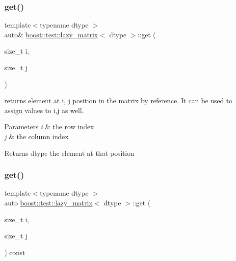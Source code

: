 \subsubsection{\texorpdfstring{get()}{get()}\hspace{0.1cm}{\footnotesize\ttfamily [1/2]}}
{\footnotesize\ttfamily template$<$typename dtype $>$ \\
auto\& \mbox{\hyperlink{classboost_1_1test_1_1lazy__matrix}{boost\+::test\+::lazy\+\_\+matrix}}$<$ dtype $>$\+::get (\begin{DoxyParamCaption}\item[{size\+\_\+t}]{i,  }\item[{size\+\_\+t}]{j }\end{DoxyParamCaption})\hspace{0.3cm}{\ttfamily [inline]}}



returns element at i, j position in the matrix by reference. It can be used to assign values to i,j as well. 


\begin{DoxyParams}{Parameters}
{\em i} & the row index \\
\hline
{\em j} & the column index \\
\hline
\end{DoxyParams}
\begin{DoxyReturn}{Returns}
dtype the element at that position 
\end{DoxyReturn}
\mbox{\label{classboost_1_1test_1_1lazy__matrix_ab974b4c433023bc7bde645cb3fdfe592}} 
\subsubsection{\texorpdfstring{get()}{get()}\hspace{0.1cm}{\footnotesize\ttfamily [2/2]}}
{\footnotesize\ttfamily template$<$typename dtype $>$ \\
auto \mbox{\hyperlink{classboost_1_1test_1_1lazy__matrix}{boost\+::test\+::lazy\+\_\+matrix}}$<$ dtype $>$\+::get (\begin{DoxyParamCaption}\item[{size\+\_\+t}]{i,  }\item[{size\+\_\+t}]{j }\end{DoxyParamCaption}) const\hspace{0.3cm}{\ttfamily [inline]}}



